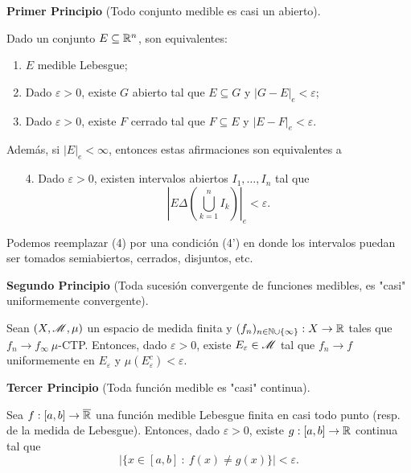 \textbf{Primer Principio} (Todo conjunto medible es casi un abierto).
\begin{theorem}
	Dado un conjunto $E \subseteq \mathbb{R}^n$, son equivalentes:
	\begin{enumerate}
		\item $E$ medible Lebesgue;

		\item Dado $\varepsilon > 0$, existe $G$ abierto tal que $E \subseteq G$ y $|G - E|_{e} < \varepsilon$;

		\item Dado $\varepsilon > 0$, existe $F$ cerrado tal que $F \subseteq E$ y $|E - F|_{e} < \varepsilon$.
	\end{enumerate}
	Además, si $|E|_{e} < \infty$, entonces estas afirmaciones son equivalentes a
	\begin{enumerate}
		\item[4.] Dado $\varepsilon > 0$, existen intervalos abiertos $I_1,\dots,I_n$ tal que
		\[ \left|E \Delta \left(\bigcup_{k=1}^{n} I_k\right)\right|_{e} < \varepsilon. \]
	\end{enumerate}
\end{theorem}

\begin{remark}
	Podemos reemplazar (4) por una condición (4') en donde los intervalos puedan ser tomados semiabiertos, cerrados, disjuntos, etc.
\end{remark}

\noindent \textbf{Segundo Principio} (Toda sucesión convergente de funciones medibles, es "casi" uniformemente convergente).
\begin{theorem}[Egorov]
	Sean $(X, \mathscr{M}, \mu)$ un espacio de medida finita y $(f_n)_{n\in\mathbb{N}\cup\{\infty\}} : X \to \mathbb{R}$ tales que $f_n \longrightarrow f_{\infty} \ \mu$-CTP. Entonces, dado $\varepsilon > 0$, existe $E_{\varepsilon} \in \mathscr{M}$ tal que $f_n \longrightarrow f$ uniformemente en $E_{\varepsilon}$ y $\mu(E_{\varepsilon}^{c}) < \varepsilon$.
\end{theorem}
\medskip{}
\noindent \textbf{Tercer Principio} (Toda función medible es "casi" continua).
\begin{theorem}[Lusin]
	Sea $f : [a,b] \to \overline{\mathbb{R}}$ una función medible Lebesgue finita en casi todo punto (resp. de la medida de Lebesgue). Entonces, dado $\varepsilon > 0$, existe $g : [a,b] \to \mathbb{R}$ continua tal que
	\[ |\{x \in [a,b] \ : \ f(x) \neq g(x)\}| < \varepsilon. \]
\end{theorem}

